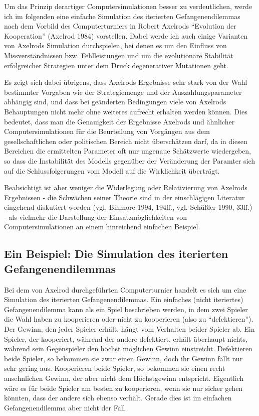 \documentclass[12pt,a4paper,ngerman]{article}
\begin{document}
Um das Prinzip derartiger Computersimulationen besser zu verdeutlichen,
werde ich im folgenden eine einfache Simulation des iterierten
Gefangenendilemmas nach dem Vorbild des Computerturniers in Robert
Axelrods "`Evolution der Kooperation"' (Axelrod 1984)
vorstellen. Dabei werde ich auch einige Varianten von Axelrods
Simulation durchspielen, bei denen es um den Einfluss von
Missverständnissen bzw. Fehlleistungen und um die evolutionäre
Stabilität erfolgreicher Strategien unter dem Druck degenerativer
Mutationen geht.

Es zeigt sich dabei übrigens, dass Axelrods Ergebnisse sehr stark von
der Wahl bestimmter Vorgaben wie der Strategiemenge und der
Auszahlungsparameter abhängig sind, und dass bei geänderten
Bedingungen viele von Axelrods Behauptungen nicht mehr ohne weiteres
aufrecht erhalten werden können. Dies bedeutet, dass man die
Genauigkeit der Ergebnisse Axelrods und ähnlicher Computersimulationen
für die Beurteilung von Vorgängen aus dem gesellschaftlichen oder
politischen Bereich nicht überschätzen darf, da in diesen Bereichen
die ermittelten Parameter oft nur ungenaue Schätzwerte wiedergeben, so
dass die Instabilität des Modells gegenüber der Veränderung der
Paramter sich auf die Schlussfolgerungen vom Modell auf die
Wirklichkeit überträgt.

Beabsichtigt ist aber weniger die Widerlegung oder Relativierung von
Axelrods Ergebnissen - die Schwächen seiner Theorie sind in der
einschlägigen Literatur eingehend diskutiert worden (vgl. Binmore 1994,
194ff., vgl. Schüßler 1990, 33ff.) - als vielmehr die Darstellung der Einsatzmöglichkeiten von
Computersimulationen an einem hinreichend einfachen Beispiel.


\subsection{Ein Beispiel: Die Simulation des iterierten Gefangenendilemmas}

Bei dem von Axelrod durchgeführten Computerturnier handelt es sich um
eine Simulation des iterierten Gefangenendilemmas. Ein einfaches (nicht iteriertes)
Gefangenendilemma kann als ein Spiel beschrieben werden, in dem zwei
Spieler die Wahl haben zu kooperieren oder nicht zu kooperieren (also
zu "`defektieren"'). Der Gewinn, den jeder Spieler erhält, hängt vom
Verhalten beider Spieler ab. Ein Spieler, der kooperiert, während der
andere defektiert, erhält überhaupt nichts, während sein Gegenspieler
den höchst möglichen Gewinn einstreicht. Defektieren beide Spieler, so
bekommen sie zwar einen Gewinn, doch ihr Gewinn fällt nur sehr gering
aus. Kooperieren beide Spieler, so bekommen sie einen recht
ansehnlichen Gewinn, der aber nicht dem Höchstgewinn
entspricht. Eigentlich wäre es für beide Spieler am besten zu
kooperieren, wenn sie nur sicher gehen könnten, dass der andere sich
ebenso verhält. Gerade dies ist im einfachen Gefangenendilemma aber
nicht der Fall.
\end{document}
